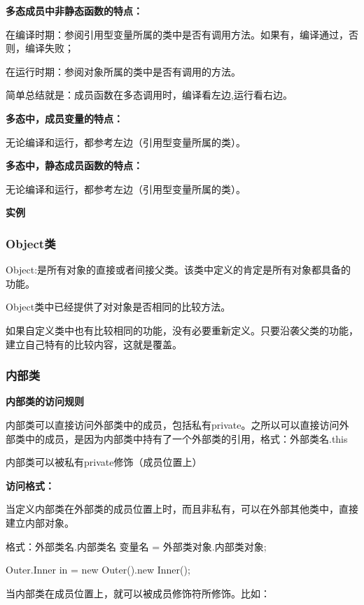 \documentclass[UTF8]{ctexart}
\begin{document}
\textbullet \textbf{多态成员中非静态函数的特点：}

\quad 在编译时期：参阅引用型变量所属的类中是否有调用方法。如果有，编译通过，否则，编译失败；

\quad 在运行时期：参阅对象所属的类中是否有调用的方法。

\quad 简单总结就是：成员函数在多态调用时，编译看左边,运行看右边。

\textbullet \textbf{多态中，成员变量的特点：}

\quad 无论编译和运行，都参考左边（引用型变量所属的类）。

\textbullet \textbf{多态中，静态成员函数的特点：}

\quad 无论编译和运行，都参考左边（引用型变量所属的类）。


\textbf{实例}


\subsubsection{Object类}

Object:是所有对象的直接或者间接父类。该类中定义的肯定是所有对象都具备的功能。

Object类中已经提供了对对象是否相同的比较方法。

如果自定义类中也有比较相同的功能，没有必要重新定义。只要沿袭父类的功能，建立自己特有的比较内容，这就是覆盖。

\subsubsection{内部类}

\textbf{内部类的访问规则}

\textbullet 内部类可以直接访问外部类中的成员，包括私有private。之所以可以直接访问外部类中的成员，是因为内部类中持有了一个外部类的引用，格式：外部类名.this

\textbullet 内部类可以被私有private修饰（成员位置上）

\textbf{访问格式：}

\textbullet 当定义内部类在外部类的成员位置上时，而且非私有，可以在外部其他类中，直接建立内部对象。

格式：外部类名.内部类名 变量名 = 外部类对象.内部类对象;

\qquad Outer.Inner in = new Outer().new Inner();

\textbullet 当内部类在成员位置上，就可以被成员修饰符所修饰。比如：
\end{document}
